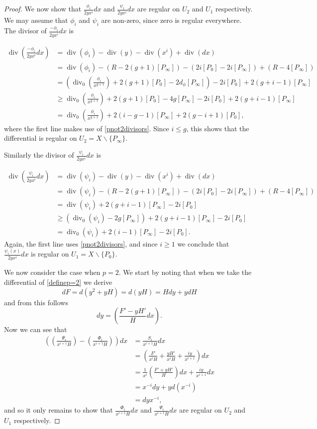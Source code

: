 \documentclass[draft, 11pt]{article} %
\theoremstyle{plain}
\theoremstyle{remark}
\DeclareMathOperator{\di}{div}
\begin{document}
\begin{proof}
We now show that $\frac{\phi_i}{2yx^i}dx$ and $\frac{\psi_i}{2yx^i}dx$ are regular on $U_2$ and $U_1$ respectively.
We may assume that $\phi_i$ and $\psi_i$ are non-zero, since zero is regular everywhere.
The divisor of $\frac{-\phi_i}{2yx^i}dx$ is

\begin{align*}
\di\left( \frac{-\phi_i}{2yx^i}dx \right) & =  \di(\phi_i) -\di(y) - \di(x^i) + \di (dx) \\
& =  \di(\phi_i) - ( R - 2(g+1)[P_\infty]) - (2i[P_0] - 2i[P_\infty]) + (R - 4[P_\infty]) \\
& =  \left( \di_0\left( \frac{\phi_i}{x^{g+1}}\right) + 2(g+1)[P_0] - 2d_\phi[P_\infty]\right) - 2i[P_0] + 2(g+i-1)[P_\infty] \\
& \geq  \di_0\left( \frac{\phi_i}{x^{g+1}}\right) + 2(g+1)[P_0] - 4g[P_\infty] - 2i[P_0] + 2(g+i-1)[P_\infty] \\
& =  \di_0\left( \frac{\phi_i}{x^{g+1}} \right) + 2(i-g-1)[P_\infty] + 2(g-i+1)[P_0],
\end{align*}
where the first line makes use of \eqref{pnot2divisors}.
Since $i \leq g$, this shows that the differential is regular on $U_2 = X\backslash \{P_\infty\}$.

Similarly the divisor of $\frac{\psi_i}{2yx^i}dx$ is

\begin{align*}
\di \left( \frac{\psi_i}{2yx^i}dx\right) & =  \di(\psi_i) - \di(y) - \di(x^i) + \di (dx) \\
& =  \di (\psi_i ) -(R - 2(g+1)[P_\infty]) - (2i[P_0] - 2i[P_\infty]) + (R -4[P_\infty]) \\
& =  \di(\psi_i) + 2(g+i-1)[P_\infty] -2i[P_0] \\
& \geq \left( \di_0(\psi_i) - 2g[P_\infty] \right) + 2(g+i-1)[P_\infty] -2i[P_0] \\
& =  \di_0(\psi_i) + 2(i-1)[P_\infty] - 2i[P_0].
\end{align*}
Again, the first line uses \eqref{pnot2divisors}, and since $i\geq 1$ we conclude that $\frac{\psi_i(x)}{2yx^i}dx$ is regular on $U_1 = X \backslash \{P_0\}$.


We now consider the case when $p=2$.
We start by noting that when we take the differential of \eqref{definep=2} we derive
\[
dF = d\left(y^2 + yH \right) = d(yH) = Hdy + ydH
\]
and from this follows 
\[
dy = \left(\frac{F'-yH'}{H}dx\right).
\]
Now we can see that
\begin{align*}
\left( \left( \frac{ \Psi_i}{x^{i+1}H} \right) - \left( \frac{\Phi_i}{x^{i+1}H} \right) \right) dx & =  \frac{S_i}{x^{i+1}H}dx \\
& =  \left( \frac{F'}{x^iH} + \frac{yH'}{x^iH} + \frac{iy}{x^{i+1}} \right) dx \\
& =  \frac{1}{x^i}\left( \frac{F' + yH'}{H} \right) dx + \frac{iy}{x^{i+1}}dx \\
& =  x^{-i}dy + yd \left( x^{-i}\right) \\
& =  dyx^{-i},
\end{align*}
and so it only remains to show that $\frac{\Phi_i}{x^{i+1}H}dx$ and $\frac{\Psi_i}{x^{i+1}H}dx$ are regular on $U_2$ and $U_1$ respectively.



\end{proof}
\end{document}
